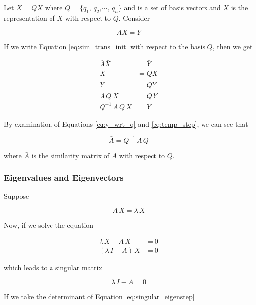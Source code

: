 Let $X = Q \bar{X}$ where $Q = \{q_1,\,  q_2, \cdots, \, q_n \}$ and is a set of
basis vectors and $\bar{X}$ is the representation of $X$ with respect to $Q$.
Consider

\begin{equation} \label{eq:sim_trans_init}
  AX = Y
\end{equation}

\noindent If we write Equation \ref{eq:sim_trans_init} with respect to the basis
$Q$, then we get

\begin{align}
  \bar{A} \bar{X} &= \bar{Y} \label{eq:y_wrt_q} \\
  X &= Q \bar{X} \\
  Y &= Q \bar{Y} \\
  A \, Q \, \bar{X} &= Q \, \bar{Y} \label{eq:temp_step}\\
  Q^{-1} \, A \, Q \, \bar{X} &= \bar{Y}
\end{align}

By examination of Equations \ref{eq:y_wrt_q} and \ref{eq:temp_step}, we can see
that

\begin{equation} \label{eq:similarity_matrix}
  \bar{A} = Q^{-1} \, A \, Q
\end{equation}

\noindent where $\bar{A}$ is the similarity matrix of $A$ with respect to $Q$.

\subsubsection{Eigenvalues and Eigenvectors}

Suppose

\begin{equation}
  A \, X = \lambda \, X
\end{equation}

Now, if we solve the equation

\begin{align}
  \lambda \, X - A \, X &= 0 \\
  (\lambda \, I - A) \, X &= 0
\end{align}

\noindent which leads to a singular matrix

\begin{equation} \label{eq:singular_eigenstep}
  \lambda \, I - A = 0
\end{equation}

If we take the determinant of Equation \ref{eq:singular_eigenstep}

